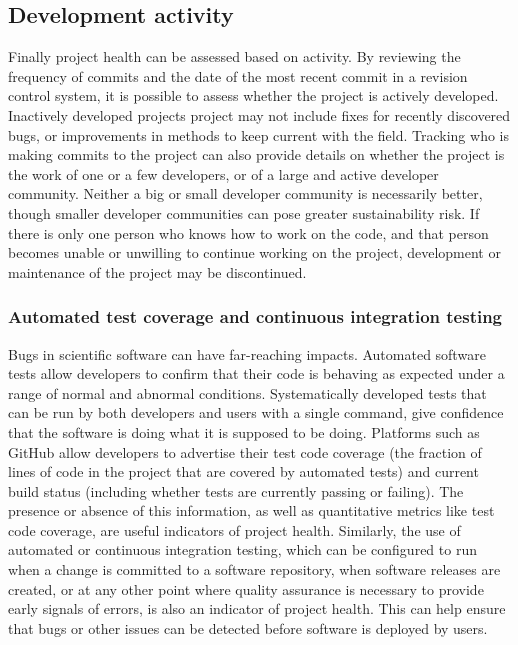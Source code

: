 \documentclass{article}
\begin{document}
\subsection{Development activity}

Finally project health can be assessed based on activity. By reviewing the frequency of commits and the date of the most recent commit in a revision control system, it is possible to assess whether the project is actively developed. Inactively developed projects project may not include fixes for recently discovered bugs, or improvements in methods to keep current with the field. Tracking who is making commits to the project can also provide details on whether the project is the work of one or a few developers, or of a large and active developer community. Neither a big or small developer community is necessarily better, though smaller developer communities can pose greater sustainability risk. If there is only one person who knows how to work on the code, and that person becomes unable or unwilling to continue working on the project, development or maintenance of the project may be discontinued. 



\subsubsection{Automated test coverage and continuous integration testing}

Bugs in scientific software can have far-reaching impacts. Automated software tests allow developers to confirm that their code is behaving as expected under a range of normal and abnormal conditions. Systematically developed tests that can be run by both developers and users with a single command, give confidence that the software is doing what it is supposed to be doing. Platforms such as GitHub allow developers to advertise their test code coverage (the fraction of lines of code in the project that are covered by automated tests) and current build status (including whether tests are currently passing or failing). The presence or absence of this information, as well as quantitative metrics like test code coverage, are useful indicators of project health. Similarly, the use of automated or continuous integration testing, which can be configured to run when a change is committed to a software repository, when software releases are created, or at any other point where quality assurance is necessary to provide early signals of errors, is also an indicator of project health. This can help ensure that bugs or other issues can be detected before software is deployed by users.
\end{document}
